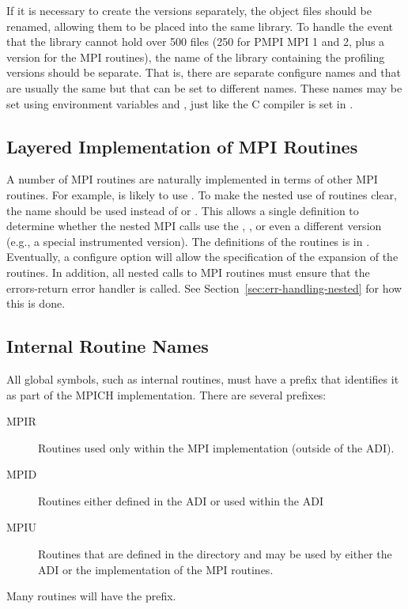 \documentclass{article}
\begin{document}
If it is necessary to create the  versions separately, the
object files should be renamed, allowing them to be placed into the
same library.  To handle the event that the library cannot hold over
500 files (250 for PMPI MPI 1 and 2, plus a version for the MPI
routines), the name of the library containing the profiling versions
should be separate.  That is, there are separate configure names
 and  that are usually the same but that
can be set to different names.  These names may be set using environment
variables  and , just like the C compiler
is set in .


\subsection{Layered Implementation of MPI Routines}
\label{sec:layered}
A number of MPI routines are naturally implemented in terms of other
MPI routines.  For example,  is likely to use
.  To make the nested use of routines clear, the
name  should be used instead of  or
.  This allows a single definition to determine whether
the nested MPI calls use the , , or even a
different version (e.g., a special instrumented version).  The
definitions of the  routines is in
.  Eventually, a configure option will allow
the specification of the expansion of the  routines.
In addition, all nested calls to MPI routines must ensure that the
errors-return error handler is called.  See
Section~\ref{sec:err-handling-nested} for how this is done.

\subsection{Internal Routine Names}
\label{sec:routine-names}
All global symbols, such as internal routines, must have a prefix that
identifies it as part of the MPICH implementation.  There are several
prefixes:
\begin{description}
\item[MPIR]Routines used only within the MPI implementation (outside of the
  ADI).
\item[MPID]Routines either defined in the ADI or used within the ADI
\item[MPIU]Routines that are defined in the  directory and
may be used by either the ADI or the implementation of the MPI
routines.
\end{description}
Many routines will have the  prefix.
\end{document}
